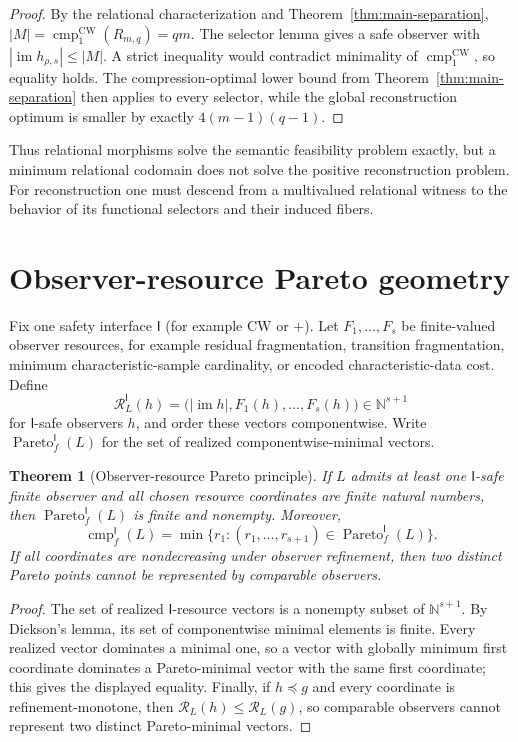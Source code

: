 \documentclass[11pt]{article}
\newtheorem{theorem}{Theorem}[section]
\theoremstyle{definition}
\theoremstyle{remark}
\newcommand{\im}{\operatorname{im}}
\newcommand{\cmp}{\operatorname{cmp}}
\newcommand{\Pareto}{\operatorname{Pareto}}
\begin{document}
\begin{proof}
By the relational characterization and
Theorem~\ref{thm:main-separation}, $|M|=\cmp_1^{\mathrm{CW}}(R_{m,q})=qm$.
The selector lemma gives a safe observer with
$|\im h_{\rho,s}|\le |M|$.  A strict inequality would contradict minimality of
$\cmp_1^{\mathrm{CW}}$, so equality holds.  The compression-optimal lower bound
from Theorem~\ref{thm:main-separation} then applies to every selector, while the
global reconstruction optimum is smaller by exactly $4(m-1)(q-1)$.
\end{proof}

Thus relational morphisms solve the semantic feasibility problem exactly, but
a minimum relational codomain does not solve the positive reconstruction
problem.  For reconstruction one must descend from a multivalued relational
witness to the behavior of its functional selectors and their induced fibers.

\section{Observer-resource Pareto geometry}
\label{sec:pareto}

Fix one safety interface $\mathsf I$ (for example $\mathrm{CW}$ or $+$).
Let $F_1,\ldots,F_s$ be finite-valued observer resources, for example residual
fragmentation, transition fragmentation, minimum characteristic-sample
cardinality, or encoded characteristic-data cost.  Define
\[
 \mathcal R_L^{\mathsf I}(h)
 =
 \bigl(
 |\im h|,F_1(h),\ldots,F_s(h)
 \bigr)
 \in\mathbb N^{s+1}
\]
for $\mathsf I$-safe observers $h$, and order these vectors componentwise.
Write $\Pareto_f^{\mathsf I}(L)$ for the set of realized componentwise-minimal
vectors.

\begin{theorem}[Observer-resource Pareto principle]
\label{thm:pareto}
If $L$ admits at least one $\mathsf I$-safe finite observer and all chosen
resource coordinates are finite natural numbers, then
$\Pareto_f^{\mathsf I}(L)$ is finite and nonempty.  Moreover,
\[
 \boxed{
 \cmp_f^{\mathsf I}(L)
 =
 \min\{r_1:(r_1,\ldots,r_{s+1})\in\Pareto_f^{\mathsf I}(L)\}.
 }
\]
If all coordinates are nondecreasing under observer refinement, then two
distinct Pareto points cannot be represented by comparable observers.
\end{theorem}

\begin{proof}
The set of realized $\mathsf I$-resource vectors is a nonempty subset of
$\mathbb N^{s+1}$.  By Dickson's lemma, its set of componentwise minimal
elements is finite.  Every realized vector dominates a minimal one, so a vector
with globally minimum first coordinate dominates a Pareto-minimal vector with
the same first coordinate; this gives the displayed equality.  Finally, if
$h\preceq g$ and every coordinate is refinement-monotone, then
$\mathcal R_L(h)\le\mathcal R_L(g)$, so comparable observers cannot represent
two distinct Pareto-minimal vectors.
\end{proof}
\end{document}
